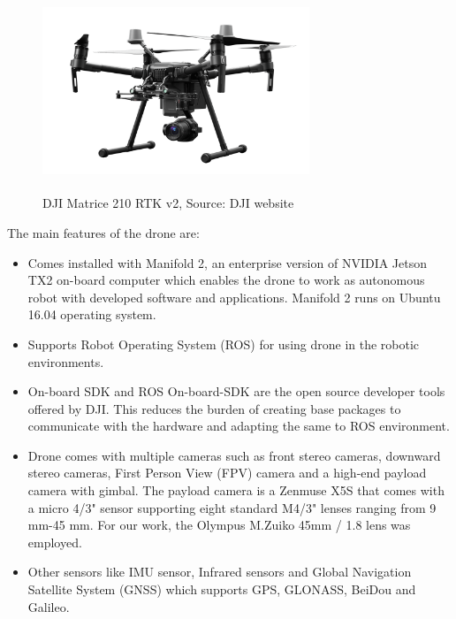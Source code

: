 \begin{figure}[h]
    \centering
    \includegraphics[width=8cm,height=6cm]{Images/drone.png}
    \caption{DJI Matrice 210 RTK v2, Source: DJI website}
    \label{fig:droneimg}
\end{figure}

The main features of the drone are:
\begin{itemize}
    \item Comes installed with Manifold 2, an enterprise version of NVIDIA Jetson TX2 on-board computer which enables the drone to work as autonomous robot with developed software and applications. Manifold 2 runs on Ubuntu 16.04 operating system.
    \item Supports Robot Operating System (ROS) for using drone in the robotic environments.
    \item On-board SDK and ROS On-board-SDK are the open source developer tools offered by DJI. This reduces the burden of creating base packages to communicate with the hardware and adapting the same to ROS environment.
    \item Drone comes with multiple cameras such as front stereo cameras, downward stereo cameras, First Person View (FPV) camera and a high-end payload camera with gimbal. The payload camera is a Zenmuse X5S that comes with a micro 4/3" sensor supporting eight standard M4/3" lenses ranging from 9 mm-45 mm. For our work, the Olympus M.Zuiko 45mm / 1.8 lens was employed. 
    \item Other sensors like IMU sensor, Infrared sensors and Global Navigation Satellite System (GNSS) which supports GPS, GLONASS, BeiDou and Galileo. 
\end{itemize}

